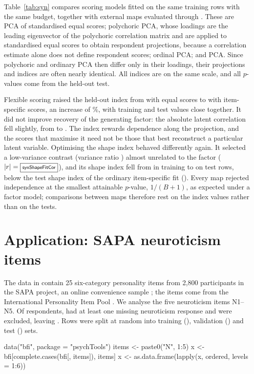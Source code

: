 Table~\ref{tab:syn} compares scoring models fitted on the same training rows with the same budget, together with external maps evaluated through . These are PCA of standardised equal scores; polychoric PCA, whose loadings are the leading eigenvector of the polychoric correlation matrix and are applied to standardised equal scores to obtain respondent projections, because a correlation estimate alone does not define respondent scores; ordinal  PCA; and  PCA. Since polychoric and ordinary PCA then differ only in their loadings, their projections and indices are often nearly identical. All indices are on the same scale, and all $p$-values come from the held-out test.

Flexible scoring raised the held-out index from \synLinTest{} with equal scores to \synItemTest{} with item-specific scores, an increase of \synGainPct\%, with training and test values close together. It did not improve recovery of the generating factor: the absolute latent correlation fell slightly, from \synLinCor{} to \synItemCor{}. The index rewards dependence along the projection, and the scores that maximise it need not be those that best reconstruct a particular latent variable. Optimising the shape index behaved differently again. It selected a low-variance contrast (variance ratio \synShapeFitVar{}) almost unrelated to the factor ($|r|=\fbox{\scriptsize\textsf{synShapeFitCor}}$), and its shape index fell from \synShapeFitTrain{} in training to \synShapeFitTest{} on test rows, below the test shape index of the ordinary item-specific fit (\synItemTestShape{}). Every map rejected independence at the smallest attainable $p$-value, $1/(B+1)$, as expected under a factor model; comparisons between maps therefore rest on the index values rather than on the tests.

\begin{table}[htbp]
\centering\small
{}
\caption{Synthetic example: training and test indices, test shape index, test variance ratio $\widehat\sigma^2_{a,s}$, held-out permutation $p$-value and absolute correlation with the latent factor for each frozen map.}
\label{tab:syn}
\end{table}

\section{Application: SAPA neuroticism items}
The  data in  contain 25 six-category personality items from 2,800 participants in the SAPA project, an online convenience sample \citep{psychTools,revelle2010}; the items come from the International Personality Item Pool \citep{goldberg1999}. We analyse the five neuroticism items N1--N5. Of \bfiNraw{} respondents, \bfiDropped{} had at least one missing neuroticism response and were excluded, leaving \bfiN{}. Rows were split at random into training (\bfiNtrain{}), validation (\bfiNvalid{}) and test (\bfiNtest{}) sets.
\begin{example}
data("bfi", package = "psychTools")
items <- paste0("N", 1:5)
x <- bfi[complete.cases(bfi[, items]), items]
x <- as.data.frame(lapply(x, ordered, levels = 1:6))
\end{example}

